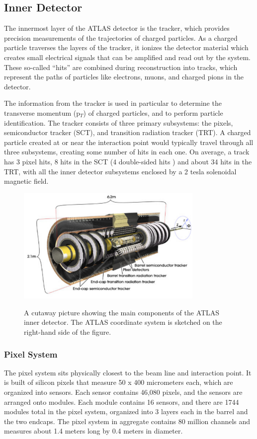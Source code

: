 \subsection{Inner Detector}
The innermost layer of the ATLAS detector is the tracker, which provides precision measurements of the trajectories of charged 
particles.  As a charged particle traverses the layers of the tracker, it ionizes the detector material which creates 
small electrical signals that can be amplified and read out by the system.  These so-called ``hits'' 
are combined during reconstruction into tracks, which represent the paths of particles like electrons, muons, and charged 
pions in the detector.

The information from the tracker is used in particular to determine the transverse momentum (p$_T$) of 
charged particles, and to perform particle identification.  The tracker consists of three primary subsystems: the pixels, 
semiconductor tracker (SCT), and transition radiation tracker (TRT).  A charged particle created at or near the 
interaction point would typically travel through all three subsystems, creating some number of hits in each one.  On 
average, a track has 3 pixel hits, 8 hits in the SCT (4 double-sided hits
) and about 34 hits in the TRT, with all the inner detector subsystems enclosed by a 2 tesla solenoidal magnetic field. 


\begin{figure}
	\includegraphics[width=0.8\textwidth]{ATLASDetector/images/innerDetector.pdf}
	\label{fig:inner_detector}  
	\caption{A cutaway picture showing the main components of the ATLAS inner detector.  The ATLAS coordinate system is sketched on the right-hand side of the figure.}
\end{figure}


\subsubsection{Pixel System}
\label{sec:pixel}
The pixel system sits physically closest to the beam line and interaction point.  It is built of silicon pixels 
that measure 50 x 400 micrometers each, which are organized into sensors.  Each sensor contains 46,080 
pixels, and the sensors are arranged onto modules.  Each module contains 16 sensors, and there are 1744 
modules total in the pixel system, organized into 3 layers each in the barrel and the two endcaps.  
The pixel system in aggregate contains 80 million channels and measures about 1.4 meters long by 0.4 meters in diameter.

